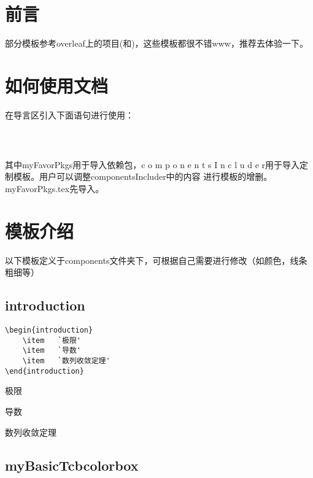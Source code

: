 \documentclass{ctexart}
\begin{document}
    \tableofcontents
    \newpage

    \section{前言}
    部分模板参考overleaf上的项目(和)，这些模板都很不错www，推荐去体验一下。

    \section{如何使用文档}
    在导言区引入下面语句进行使用：
    \begin{lstlisting}
        
        
    \end{lstlisting}

    其中myFavorPkgs用于导入依赖包，c o m p o n e n t s I n c l u d e r用于导入定制模板。用户可以调整componentsIncluder中的内容
    进行模板的增删。myFavorPkgs.tex先导入。
    \newpage
    \section{模板介绍}
    以下模板定义于components文件夹下，可根据自己需要进行修改（如颜色，线条粗细等）
    \subsection{introduction}

    \begin{lstlisting}
\begin{introduction}
    \item   `极限'
    \item   `导数'
    \item   `数列收敛定理'
\end{introduction}
    \end{lstlisting}
    
    \begin{introduction}
        \item   极限
        \item   导数
        \item   数列收敛定理
    \end{introduction}
    
    \subsection{myBasicTcbcolorbox}
    
\end{document}
